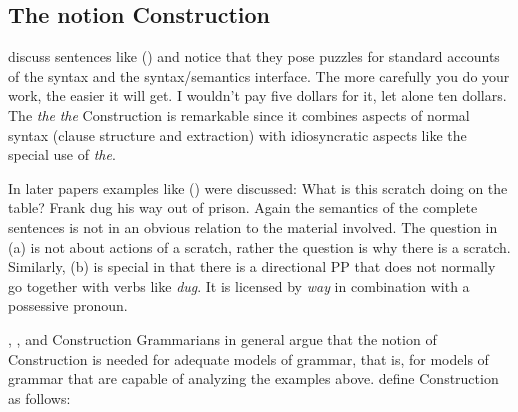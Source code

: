 \documentclass[output=paper]{langsci/langscibook}
\begin{document}
\subsection{The notion Construction}
\label{sec-def-construction}

\citet*{FKoC88a} discuss sentences like () and notice that they pose puzzles for standard
accounts of the syntax and the syntax/semantics interface. 
\eal
\ex The more carefully you do your work, the easier it will get.
\ex I wouldn't pay five dollars for it, let alone ten dollars.
\zl
The \emph{the}  \emph{the}  Construction is remarkable since it combines aspects of normal syntax
(clause structure and extraction) with idiosyncratic aspects like the special use of
\emph{the}.

In later papers examples like () were discussed:
\eal
\ex What is this scratch doing on the table? \hfill\citep[]{KF99a}
\ex Frank dug his way out of prison. \hfill\citep[]{Goldberg95a}
\zl
Again the semantics of the complete sentences is not in an obvious relation to the material
involved. The question in (a) is not about actions of a scratch, rather the question is why
there is a scratch. Similarly, (b) is special in that there is a directional PP that does not
normally go together with verbs like \emph{dug}. It is licensed by \emph{way} in combination with a
possessive pronoun.

\citet{FKoC88a}, \citet{Goldberg95a}, \citet{KF99a} and Construction Grammarians in general argue
that the notion of Construction is needed for adequate models of grammar, that is, for models of
grammar that are capable of analyzing the examples above. \citet[]{FKoC88a} define
Construction as follows: 
\end{document}
